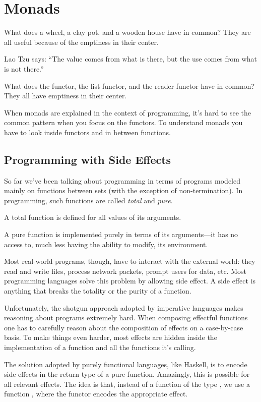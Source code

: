 \documentclass[DaoFP]{subfiles}
\begin{document}
\setcounter{chapter}{12}

\chapter{Monads}

What does a wheel, a clay pot, and a wooden house have in common? They are all useful because of the emptiness in their center. 

Lao Tzu says: ``The value comes from what is there, but the use comes from what is not there.''

What does the  functor, the list functor, and the reader functor have in common? They all have emptiness in their center. 

When monads are explained in the context of programming, it's hard to see the common pattern when you focus on the functors. To understand monads you have to look inside functors and in between functions.

\section{Programming with Side Effects}

So far we've been talking about programming in terms of programs modeled mainly on functions between sets (with the exception of non-termination). In programming, such functions are called \emph{total} and \emph{pure}. 

A total function is defined for all values of its arguments. 

A pure function is implemented purely in terms of its arguments---it has no access to, much less having the ability to modify, its environment. 

Most real-world programs, though, have to interact with the external world: they read and write files, process network packets, prompt users for data, etc. Most programming languages solve this problem by allowing side effect. A side effect is anything that breaks the totality or the purity of a function. 

Unfortunately, the shotgun approach adopted by imperative languages makes reasoning about programs extremely hard. When composing effectful functions one has to carefully reason about the composition of effects on a case-by-case basis. To make things even harder, most effects are hidden inside the implementation of a function and all the functions it's calling.

The solution adopted by purely functional languages, like Haskell, is to encode side effects in the return type of a pure function. Amazingly, this is possible for all relevant effects. The idea is that, instead of a function of the type , we use a function , where the functor  encodes the appropriate effect. 
\end{document}
